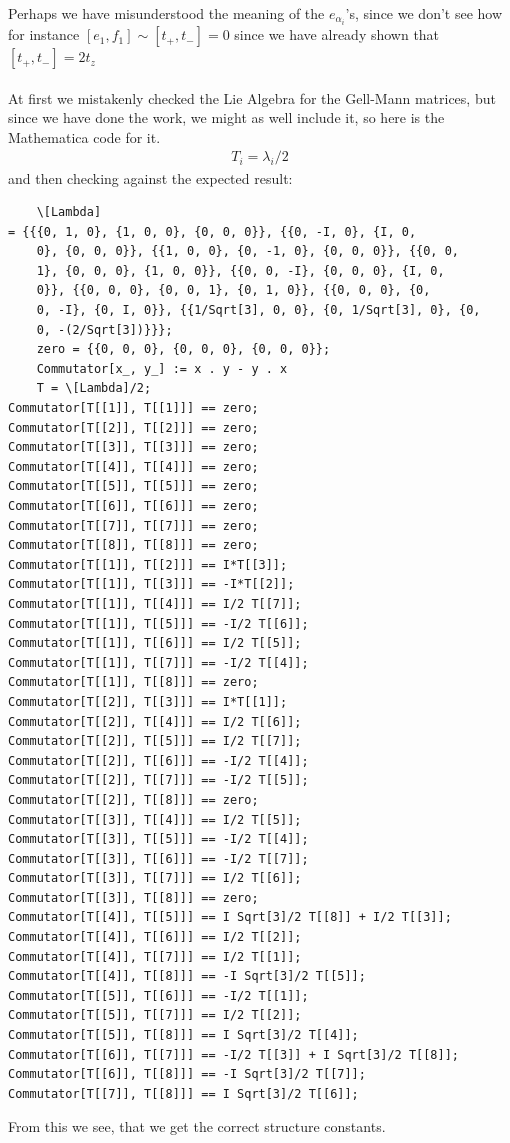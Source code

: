 \documentclass[a4paper,12pt]{article}
\begin{document}
Perhaps we have misunderstood the meaning of the $e_{\alpha_i}$'s, since we don't see how for instance $[e_1,f_1]\sim [t_+,t_-]=0$ since we have already shown that $[t_+,t_-]=2t_z$
\\\\
At first we mistakenly checked the Lie Algebra for the Gell-Mann matrices, but since we have done the work, we might as well include it, so here is the Mathematica code for it.
\begin{equation}
	\begin{aligned}
		T_i=\lambda_i/2
	\end{aligned}
\end{equation}
and then checking against the expected result:
\begin{lstlisting}
	\[Lambda] 
= {{{0, 1, 0}, {1, 0, 0}, {0, 0, 0}}, {{0, -I, 0}, {I, 0, 
	0}, {0, 0, 0}}, {{1, 0, 0}, {0, -1, 0}, {0, 0, 0}}, {{0, 0, 
	1}, {0, 0, 0}, {1, 0, 0}}, {{0, 0, -I}, {0, 0, 0}, {I, 0, 
	0}}, {{0, 0, 0}, {0, 0, 1}, {0, 1, 0}}, {{0, 0, 0}, {0, 
	0, -I}, {0, I, 0}}, {{1/Sqrt[3], 0, 0}, {0, 1/Sqrt[3], 0}, {0, 
	0, -(2/Sqrt[3])}}};
	zero = {{0, 0, 0}, {0, 0, 0}, {0, 0, 0}};
	Commutator[x_, y_] := x . y - y . x
	T = \[Lambda]/2;
Commutator[T[[1]], T[[1]]] == zero;
Commutator[T[[2]], T[[2]]] == zero;
Commutator[T[[3]], T[[3]]] == zero;
Commutator[T[[4]], T[[4]]] == zero;
Commutator[T[[5]], T[[5]]] == zero;
Commutator[T[[6]], T[[6]]] == zero;
Commutator[T[[7]], T[[7]]] == zero;
Commutator[T[[8]], T[[8]]] == zero;
Commutator[T[[1]], T[[2]]] == I*T[[3]];
Commutator[T[[1]], T[[3]]] == -I*T[[2]];
Commutator[T[[1]], T[[4]]] == I/2 T[[7]];
Commutator[T[[1]], T[[5]]] == -I/2 T[[6]];
Commutator[T[[1]], T[[6]]] == I/2 T[[5]];
Commutator[T[[1]], T[[7]]] == -I/2 T[[4]];
Commutator[T[[1]], T[[8]]] == zero;
Commutator[T[[2]], T[[3]]] == I*T[[1]];
Commutator[T[[2]], T[[4]]] == I/2 T[[6]];
Commutator[T[[2]], T[[5]]] == I/2 T[[7]];
Commutator[T[[2]], T[[6]]] == -I/2 T[[4]];
Commutator[T[[2]], T[[7]]] == -I/2 T[[5]];
Commutator[T[[2]], T[[8]]] == zero;
Commutator[T[[3]], T[[4]]] == I/2 T[[5]];
Commutator[T[[3]], T[[5]]] == -I/2 T[[4]];
Commutator[T[[3]], T[[6]]] == -I/2 T[[7]];
Commutator[T[[3]], T[[7]]] == I/2 T[[6]];
Commutator[T[[3]], T[[8]]] == zero;
Commutator[T[[4]], T[[5]]] == I Sqrt[3]/2 T[[8]] + I/2 T[[3]];
Commutator[T[[4]], T[[6]]] == I/2 T[[2]];
Commutator[T[[4]], T[[7]]] == I/2 T[[1]];
Commutator[T[[4]], T[[8]]] == -I Sqrt[3]/2 T[[5]];
Commutator[T[[5]], T[[6]]] == -I/2 T[[1]];
Commutator[T[[5]], T[[7]]] == I/2 T[[2]];
Commutator[T[[5]], T[[8]]] == I Sqrt[3]/2 T[[4]];
Commutator[T[[6]], T[[7]]] == -I/2 T[[3]] + I Sqrt[3]/2 T[[8]];
Commutator[T[[6]], T[[8]]] == -I Sqrt[3]/2 T[[7]];
Commutator[T[[7]], T[[8]]] == I Sqrt[3]/2 T[[6]];
\end{lstlisting}
From this we see, that we get the correct structure constants.
\end{document}
